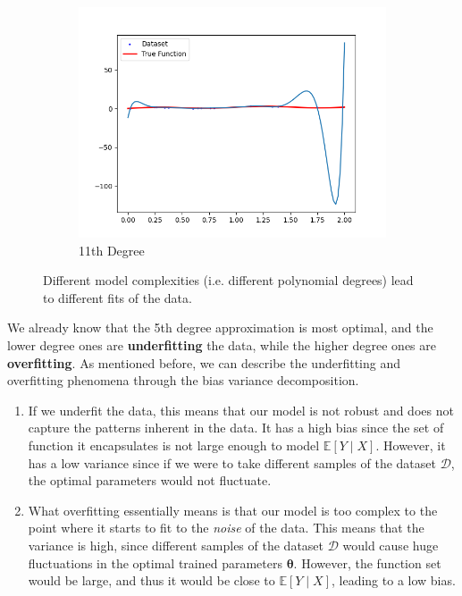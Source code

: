 \documentclass{article}
\theoremstyle{definition}
\begin{document}
\begin{figure}[hbt!]
\begin{subfigure}[b]{0.32\textwidth}
            \includegraphics[width=\textwidth]{polynomial_first/poly_11_fit.png}
            \caption{11th Degree}
            \label{fig:11e}
        \end{subfigure}

        \caption{Different model complexities (i.e. different polynomial degrees) lead to different fits of the data. }
        \label{fig:polynomial_fitting}
        
    \end{figure}

    We already know that the 5th degree approximation is most optimal, and the lower degree ones are \textbf{underfitting} the data, while t\pgfplotsset{compat=1.7}he higher degree ones are \textbf{overfitting}. As mentioned before, we can describe the underfitting and overfitting phenomena through the bias variance decomposition. 
    \begin{enumerate}
        \item If we underfit the data, this means that our model is not robust and does not capture the patterns inherent in the data. It has a high bias since the set of function it encapsulates is not large enough to model $\mathbb{E}[Y\mid X]$. However, it has a low variance since if we were to take different samples of the dataset $\mathcal{D}$, the optimal parameters would not fluctuate. 

        \item What overfitting essentially means is that our model is too complex to the point where it starts to fit to the \textit{noise} of the data. This means that the variance is high, since different samples of the dataset $\mathcal{D}$ would cause huge fluctuations in the optimal trained parameters $\boldsymbol{\theta}$. However, the function set would be large, and thus it would be close to $\mathbb{E}[Y \mid X]$, leading to a low bias. 
    \end{enumerate}
\end{document}

